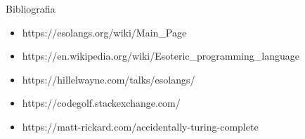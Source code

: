 \begin{frame}{Bibliografia}
	\vspace*{0.1cm}
	{\small
	\begin{itemize}
		\item https://esolangs.org/wiki/Main\_Page	%
		\item https://en.wikipedia.org/wiki/Esoteric\_programming\_language	%
		\item https://hillelwayne.com/talks/esolangs/	%
		\item https://codegolf.stackexchange.com/	%
		\item https://matt-rickard.com/accidentally-turing-complete	%
	\end{itemize}
	}
\end{frame}
